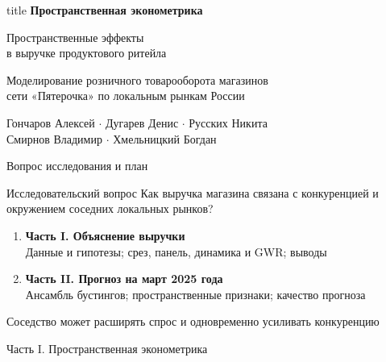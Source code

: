 \documentclass[aspectratio=169,11pt]{beamer}
\newcommand{\tightitems}{\setlength{\itemsep}{0.45em}\setlength{\parskip}{0pt}}
\begin{document}
\begin{frame}[plain]
\vspace{0.2cm}
\begin{beamercolorbox}[rounded=true,shadow=true,sep=0.4cm,center]{title}
{\large\bfseries Пространственная эконометрика}\par\vspace{0.28cm}
{\LARGE Пространственные эффекты\\в выручке продуктового ритейла}\par\vspace{0.24cm}
{\normalsize Моделирование розничного товарооборота магазинов\\сети «Пятерочка» по локальным рынкам России}
\end{beamercolorbox}
\vspace{0.65cm}\centering
{\normalsize Гончаров Алексей \(\cdot\) Дугарев Денис \(\cdot\) Русских Никита\\[0.15cm]
Смирнов Владимир \(\cdot\) Хмельницкий Богдан}\par
\vspace{0.5cm}{\small Домашнее задание}\par
\vspace{0.4cm}{\small Москва, 2026}
\end{frame}

\begin{frame}{Вопрос исследования и план}
\begin{block}{Исследовательский вопрос}
Как выручка магазина связана с конкуренцией и окружением соседних локальных рынков?
\end{block}
\vspace{2mm}
\begin{enumerate}\tightitems
\item \textbf{Часть I. Объяснение выручки}\\
\small Данные и гипотезы; срез, панель, динамика и GWR; выводы
\item \normalsize\textbf{Часть II. Прогноз на март 2025 года}\\
\small Ансамбль бустингов; пространственные признаки; качество прогноза
\end{enumerate}
\vspace{3mm}\small Соседство может расширять спрос и одновременно усиливать конкуренцию
\end{frame}


\begingroup
{}
\begin{frame}[label=part-one]{Часть I. Пространственная эконометрика}
\end{frame}
\endgroup
\end{document}
